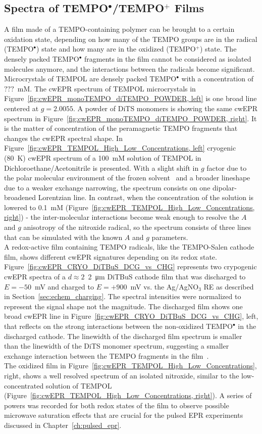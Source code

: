 \subsection{Spectra of TEMPO$^{\bullet}$/TEMPO$^{+}$ Films}
A film made of a TEMPO-containing polymer can be brought to a certain oxidation state, depending on how many of the TEMPO groups are in the radical (TEMPO$^{\bullet}$) state and how many are in the oxidized (TEMPO$^{+}$) state. The densely packed TEMPO$^{\bullet}$ fragments in the film cannot be considered as isolated molecules anymore, and the interactions between the radicals become significant. Microcrystals of TEMPOL are densely packed TEMPO$^{\bullet}$ with a concentration of $???$~mM. The cwEPR spectrum of TEMPOL microcrystals in Figure~\ref{fig:cwEPR_monoTEMPO_diTEMPO_POWDER, left} is one broad line centered at $g=2.0055$. A powder of DiTS monomers is showing the same cwEPR spectrum in Figure~\ref{fig:cwEPR_monoTEMPO_diTEMPO_POWDER, right}. It is the matter of concentration of the peramagnetic TEMPO fragments that changes the cwEPR spectral shape. In Figure~\ref{fig:cwEPR_TEMPOL_High_Low_Concentrations, left} cryogenic (80~K) cwEPR spectrum of a 100~mM solution of TEMPOL in Dichloroethane/Acetonitrile is presented. With a slight shift in $g$ factor due to the polar molecular environment of the frozen solvent~\cite{Siavash} and a broader lineshape due to a weaker exchange narrowing, the spectrum consists on one dipolar-broadened Lorentzian line. In contrast, when the concentration of the solution is lowered to 0.1~mM (Figure~\ref{fig:cwEPR_TEMPOL_High_Low_Concentrations, right}) - the inter-molecular interactions become weak enough to resolve the $A$ and $g$ anisotropy of the nitroxide radical, so the spectrum consists of three lines that can be simulated with the known $A$ and $g$ parameters.\\
A redox-active film containing TEMPO radicals, like the TEMPO-Salen cathode film, shows different cwEPR signatures depending on its redox state. Figure~\ref{fig:cwEPR_CRYO_DiTBuS_DCG_vs_CHG} represents two crypogenic cwEPR spectra of a $d\approx2$~\SI{2}{\micro\meter} DiTBuS cathode film that was discharged to $E=-50$~mV and charged to $E=+900$~mV vs. the Ag/AgNO$_3$ RE as described in Section~\ref{sec:echem_charging}. The spectral intensities were normalized to represent the signal shape not the magnitude. The discharged film shows one broad cwEPR line in Figure~\ref{fig:cwEPR_CRYO_DiTBuS_DCG_vs_CHG}, left, that reflects on the strong interactions between the non-oxidized TEMPO$^{\bullet}$ in the discharged cathode. The linewidth of the discharged film spectrum is smaller than the linewidth of the DiTS monomer spectrum, suggesting a smaller exchange interaction between the TEMPO fragments in the film~\cite{Vereshchagin_2020}.\\
The oxidized film in Figure~\ref{fig:cwEPR_TEMPOL_High_Low_Concentrations}, right, shows a well resolved spectrum of an isolated nitroxide, similar to the low-concentrated solution of TEMPOL (Figure~\ref{fig:cwEPR_TEMPOL_High_Low_Concentrations, right}). A series of powers was recorded for both redox states of the film to observe possible microwave saturation effects that are crucial for the pulsed EPR experiments discussed in Chapter~\ref{ch:pulsed_epr}.

